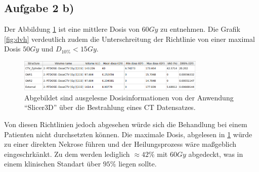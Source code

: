 \subsection{Aufgabe 2 b)}
Der Abbildung \ref{fig:slicer} ist eine mittlere Dosis von $60 Gy$ zu entnehmen. Die Grafik \ref{fig:dvh} verdeutlich zudem die 
Unterschreitung der Richtlinie von einer maximal Dosis $50 Gy$ und $D_{10\%} < 15 Gy$. 
\begin{figure}
    \centering
    \includegraphics[width  = 0.8\textwidth]{content/slicer.png}
    \caption{Abgebildet sind ausgelesne Dosisinformationen von der Anwendung \enquote{Slicer3D} über die Bestrahlung eines CT Datensatzes.}
    \label{fig:slicer}
\end{figure}
\noindent
Von diesen Richtlinien jedoch abgesehen würde sich die Behandlung bei einem Patienten nicht durchsetzten können. 
Die maximale Dosis, abgelesen in \ref{fig:slicer} würde zu einer direkten Nekrose führen und der Heilungsprozess wäre maßgeblich 
eingeschrkänkt. Zu dem werden lediglich $\approx 42\%$ mit $60Gy$ abgedeckt, was in einem klinischen Standart über $95\%$ liegen sollte.


